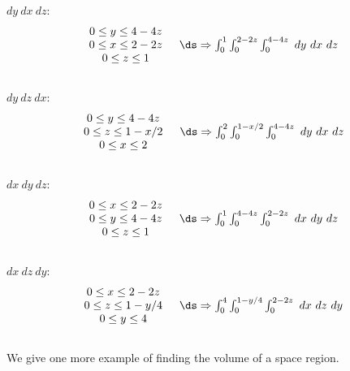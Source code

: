 {\noindent $dy\ dx\ dz$:
$$\begin{array}{cc}
		\begin{array}{c}
		0\leq y\leq 4-4z\\
		0\leq x\leq 2-2z\\
		0\leq z\leq 1
		\end{array} 
		& 
		\ds \Rightarrow \int_0^1\int_{0}^{2-2z}\int_0^{4-4z}\ dy\ dx\ dz 
	\end{array}
$$\\
\drawexampleline
\noindent $dy\ dz\ dx$:
$$\begin{array}{cc}
		\begin{array}{c}
		0\leq y\leq 4-4z\\
		0\leq z\leq 1-x/2\\
		0\leq x\leq 2
		\end{array} 
		& 
		\ds \Rightarrow \int_0^2\int_{0}^{1-x/2}\int_0^{4-4z}\ dy\ dx\ dz 
	\end{array}
$$\\

\noindent $dx\ dy\ dz$:
$$\begin{array}{cc}
		\begin{array}{c}
		0\leq x\leq 2-2z\\
		0\leq y\leq 4-4z\\
		0\leq z\leq 1
		\end{array} 
		& 
		\ds \Rightarrow \int_0^1\int_{0}^{4-4z}\int_0^{2-2z}\ dx\ dy\ dz 
	\end{array}
$$\\



\noindent $dx\ dz\ dy$:
$$\begin{array}{cc}
		\begin{array}{c}
		0\leq x\leq 2-2z\\
		0\leq z\leq 1-y/4\\
		0\leq y\leq 4
		\end{array} 
		& 
		\ds \Rightarrow \int_0^4\int_{0}^{1-y/4}\int_0^{2-2z}\ dx\ dz\ dy 
	\end{array}
$$
\baselineskip
}\\

We give one more example of finding the volume of a space region.\\

